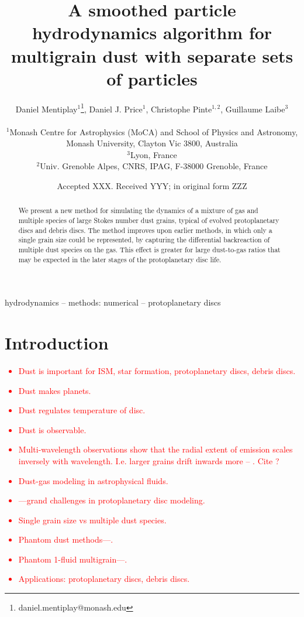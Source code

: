 \documentclass[fleqn,usenatbib]{mnras}
\title[SPH for multigrain dust]{A smoothed particle hydrodynamics algorithm for
multigrain dust with separate sets of particles}
\author[Mentiplay, Price, Pinte, \& Laibe]{%
   \parbox{\textwidth}{%
      Daniel Mentiplay\(^{1}\)\thanks{daniel.mentiplay@monash.edu},
      Daniel J. Price\(^{1}\),
      Christophe Pinte\(^{1,2}\),
      Guillaume Laibe\(^{3}\)}\\
   \(^{1}\)Monash Centre for Astrophysics (MoCA) and School of Physics and
   Astronomy, Monash University, Clayton Vic 3800, Australia \\
   \(^{3}\)Lyon, France \\
   \(^{2}\)Univ. Grenoble Alpes, CNRS, IPAG, F-38000 Grenoble, France}
\date{Accepted XXX. Received YYY; in original form ZZZ}
\begin{document}
\label{firstpage}
\pagerange{\pageref{firstpage}--\pageref{lastpage}}
\maketitle

\begin{abstract}
   We present a new method for simulating the dynamics of a mixture of gas and
   multiple species of large Stokes number dust grains, typical of evolved
   protoplanetary discs and debris discs. The method improves upon earlier
   methods, in which only a single grain size could be represented, by capturing
   the differential backreaction of multiple dust species on the gas. This
   effect is greater for large dust-to-gas ratios that may be expected in the
   later stages of the protoplanetary disc life.
\end{abstract}

\begin{keywords}
hydrodynamics -- methods: numerical -- protoplanetary discs
\end{keywords}



\section{Introduction}

\textcolor{red}{
\begin{itemize}
   \item Dust is important for ISM, star formation, protoplanetary discs, debris
      discs.
   \item Dust makes planets.
   \item Dust regulates temperature of disc.
   \item Dust is observable.
   \item Multi-wavelength observations show that the radial extent of emission
      scales inversely with wavelength. I.e. larger grains drift inwards more --
      \citet{Andrews2012ApJ...744..162A}. Cite \citet{Testi2014prpl.conf..339T}?
   \item Dust-gas modeling in astrophysical fluids.
   \item \citet{Haworth2016PASA...33...53H}---grand challenges in protoplanetary
      disc modeling.
   \item Single grain size vs multiple dust species.
   \item Phantom dust methods---\citet{Price2018PASA...35...31P}.
   \item Phantom 1-fluid multigrain---\citet{Hutchison2018MNRAS.476.2186H}.
   \item Applications: protoplanetary discs, debris discs.
\end{itemize}
}
\end{document}
